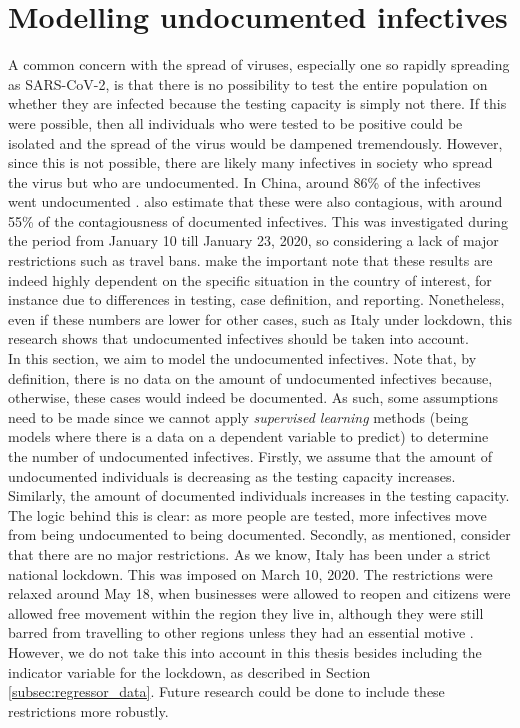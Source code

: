 \documentclass[12pt]{article}
\begin{document}
	\section{Modelling undocumented infectives} \label{sec:undocumented_modelling}
	A common concern with the spread of viruses, especially one so rapidly spreading as SARS-CoV-2, is that there is no possibility to test the entire population on whether they are infected because the testing capacity is simply not there. If this were possible, then all individuals who were tested to be positive could be isolated and the spread of the virus would be dampened tremendously. However, since this is not possible, there are likely many infectives in society who spread the virus but who are undocumented. In China, around 86\% of the infectives went undocumented \parencite{li2020undocumented}. \textcite{li2020undocumented} also estimate that these were also contagious, with around 55\% of the contagiousness of documented infectives. This was investigated during the period from January 10 till January 23, 2020, so considering a lack of major restrictions such as travel bans. \textcite{li2020undocumented} make the important note that these results are indeed highly dependent on the specific situation in the country of interest, for instance due to differences in testing, case definition, and reporting. Nonetheless, even if these numbers are lower for other cases, such as Italy under lockdown, this research shows that undocumented infectives should be taken into account. \\
	
	In this section, we aim to model the undocumented infectives. Note that, by definition, there is no data on the amount of undocumented infectives because, otherwise, these cases would indeed be documented. As such, some assumptions need to be made since we cannot apply \textit{supervised learning} methods (being models where there is a data on a dependent variable to predict) to determine the number of undocumented infectives. Firstly, we assume that the amount of undocumented individuals is decreasing as the testing capacity increases. Similarly, the amount of documented individuals increases in the testing capacity. The logic behind this is clear: as more people are tested, more infectives move from being undocumented to being documented. Secondly, as mentioned, \textcite{li2020undocumented} consider that there are no major restrictions. As we know, Italy has been under a strict national lockdown. This was imposed on March 10, 2020. The restrictions were relaxed around May 18, when businesses were allowed to reopen and citizens were allowed free movement within the region they live in, although they were still barred from travelling to other regions unless they had an essential motive \parencite{severgnini2020relaxLockdown}. However, we do not take this into account in this thesis besides including the indicator variable for the lockdown, as described in Section \ref{subsec:regressor_data}. Future research could be done to include these restrictions more robustly.\\
	
\end{document}
